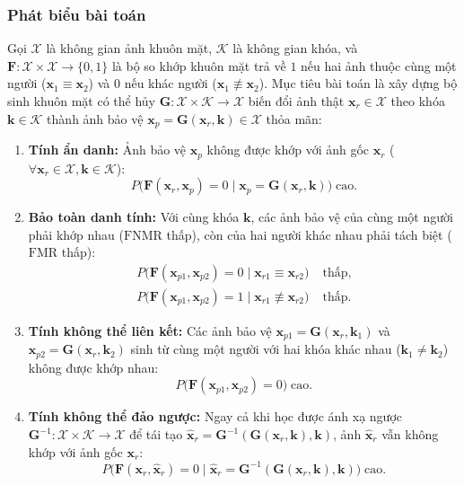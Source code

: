 \documentclass[oneside,a4paper,12pt]{extarticle}
\begin{document}
\subsubsection{Phát biểu bài toán}

\begingroup
\setlength{\abovedisplayskip}{5pt plus 2pt minus 2pt}
\setlength{\belowdisplayskip}{5pt plus 2pt minus 2pt}

Gọi $\mathcal{X}$ là không gian ảnh khuôn mặt, $\mathcal{K}$ là không gian khóa, và $\mathbf{F} : \mathcal{X} \times \mathcal{X} \rightarrow \{0, 1\}$ là bộ so khớp khuôn mặt trả về $1$ nếu hai ảnh thuộc cùng một người ($\mathbf{x}_1 \equiv \mathbf{x}_2$) và $0$ nếu khác người ($\mathbf{x}_1 \not\equiv \mathbf{x}_2$). Mục tiêu bài toán là xây dựng bộ sinh khuôn mặt có thể hủy $\mathbf{G} : \mathcal{X} \times \mathcal{K} \rightarrow \mathcal{X}$ biến đổi ảnh thật $\mathbf{x}_r \in \mathcal{X}$ theo khóa $\mathbf{k} \in \mathcal{K}$ thành ảnh bảo vệ $\mathbf{x}_p = \mathbf{G}(\mathbf{x}_r, \mathbf{k}) \in \mathcal{X}$ thỏa mãn:
\begin{enumerate}\setlength{\itemsep}{2pt}\setlength{\parskip}{0pt}
    \item \textbf{Tính ẩn danh:} Ảnh bảo vệ $\mathbf{x}_p$ không được khớp với ảnh gốc $\mathbf{x}_r$ ($\forall \mathbf{x}_r \in \mathcal{X}, \mathbf{k} \in \mathcal{K}$):
    \[
    P\bigl(\mathbf{F}(\mathbf{x}_r, \mathbf{x}_p) = 0 \mid \mathbf{x}_p = \mathbf{G}(\mathbf{x}_r, \mathbf{k})\bigr) \;\text{cao}.
    \]
    \item \textbf{Bảo toàn danh tính:} Với cùng khóa $\mathbf{k}$, các ảnh bảo vệ của cùng một người phải khớp nhau ($\text{FNMR}$ thấp), còn của hai người khác nhau phải tách biệt ($\text{FMR}$ thấp):
    \[
    \begin{aligned}
    P\bigl(\mathbf{F}(\mathbf{x}_{p1}, \mathbf{x}_{p2}) = 0 \mid \mathbf{x}_{r1} \equiv \mathbf{x}_{r2}\bigr) &\;\text{thấp}, \\
    P\bigl(\mathbf{F}(\mathbf{x}_{p1}, \mathbf{x}_{p2}) = 1 \mid \mathbf{x}_{r1} \not\equiv \mathbf{x}_{r2}\bigr) &\;\text{thấp}.
    \end{aligned}
    \]
    \item \textbf{Tính không thể liên kết:} Các ảnh bảo vệ $\mathbf{x}_{p1} = \mathbf{G}(\mathbf{x}_r, \mathbf{k}_1)$ và $\mathbf{x}_{p2} = \mathbf{G}(\mathbf{x}_r, \mathbf{k}_2)$ sinh từ cùng một người với hai khóa khác nhau ($\mathbf{k}_1 \neq \mathbf{k}_2$) không được khớp nhau:
    \[
    P\bigl(\mathbf{F}(\mathbf{x}_{p1}, \mathbf{x}_{p2}) = 0\bigr) \;\text{cao}.
    \]
    \item \textbf{Tính không thể đảo ngược:} Ngay cả khi học được ánh xạ ngược $\mathbf{G}^{-1} : \mathcal{X} \times \mathcal{K} \rightarrow \mathcal{X}$ để tái tạo $\hat{\mathbf{x}}_r = \mathbf{G}^{-1}(\mathbf{G}(\mathbf{x}_r, \mathbf{k}), \mathbf{k})$, ảnh $\hat{\mathbf{x}}_r$ vẫn không khớp với ảnh gốc $\mathbf{x}_r$:
    \[
    P\bigl(\mathbf{F}(\mathbf{x}_r, \hat{\mathbf{x}}_r) = 0 \mid \hat{\mathbf{x}}_r = \mathbf{G}^{-1}(\mathbf{G}(\mathbf{x}_r, \mathbf{k}), \mathbf{k})\bigr) \;\text{cao}.
    \]
\end{enumerate}
\end{document}
